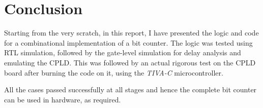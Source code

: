 \documentclass[a4paper, 11pt]{article}
\begin{document}
\section*{Conclusion}
Starting from the very scratch, in this report, I have presented the logic and code for a combinational implementation of a bit counter. The logic was tested using RTL simulation, followed by the gate-level simulation for delay analysis and emulating the CPLD. This was followed by an actual rigorous test on the CPLD board after burning the code on it, using the \emph{TIVA-C} microcontroller.
\par
All the cases passed successfully at all stages and hence the complete bit counter can be used in hardware, as required.
\end{document}
